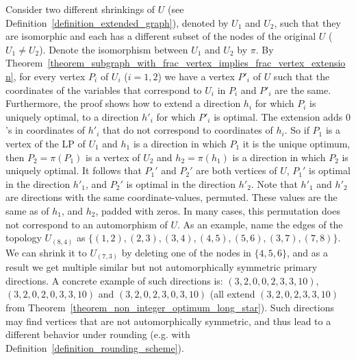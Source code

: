 \begin{remark}
\label{remark_pseudo_symmetry}
Consider two different shrinkings of $U$ (see Definition~\ref{definition_extended_graph}), denoted by $U_1$ and $U_2$, such that they are isomorphic and each has a different  subset of the nodes of the original $U$ ($U_1 \ne U_2$). Denote the isomorphism between $U_1$ and $U_2$ by $\pi$. By Theorem~\ref{theorem_subgraph_with_frac_vertex_implies_frac_vertex_extension}, for every vertex $P_i$ of $U_i$ ($i=1,2$) we have a vertex $P'_i$ of $U$ such that the coordinates of the variables that correspond to $U_i$
in $P_i$ and $P'_i$ are the same. 
Furthermore, the proof shows how to extend a direction $h_i$ for which $P_i$ is uniquely optimal, to a direction $h'_i$ for which $P'_i$ is optimal. The extension adds $0$'s in coordinates of $h'_i$ that do not correspond to coordinates of $h_i$. So if $P_1$ is a vertex of the LP of $U_1$ and $h_1$ is a direction in which $P_1$ it is the unique optimum, then $P_2 = \pi(P_1)$ is a vertex of $U_2$ and $h_2 = \pi(h_1)$ is a direction in which $P_2$ is uniquely optimal.
It follows that $P_1'$ and $P_2'$ are both vertices of $U$, $P_1'$ is optimal in the direction $h'_1$, and $P_2'$ is optimal in the direction $h'_2$. 
Note that
$h'_1$ and $h'_2$ are directions with the same coordinate-values, permuted. These values are the same as of $h_1$, and  $h_2$, padded with zeros. In many cases, this permutation does not correspond to an automorphism of $U$. As an example, name the edges of the topology $U_{(8,4)}$ as $\{(1,2),(2,3),(3,4),(4,5),(5,6),(3,7),(7,8)\}$. We can shrink it to $U_{(7,3)}$ by deleting one of the nodes in $\{4,5,6\}$, and as a result we get multiple similar but not automorphically symmetric primary directions. A concrete example of such directions is: $(3,2,0,0,2,3,3,10)$, $(3,2,0,2,0,3,3,10)$ and $(3,2,0,2,3,0,3,10)$ (all extend $(3,2,0,2,3,3,10)$ from Theorem~\ref{theorem_non_integer_optimum_long_star}). Such directions may find vertices that are not automorphically symmetric, and thus lead to a different behavior under rounding (e.g. with Definition~\ref{definition_rounding_scheme}).
\end{remark}